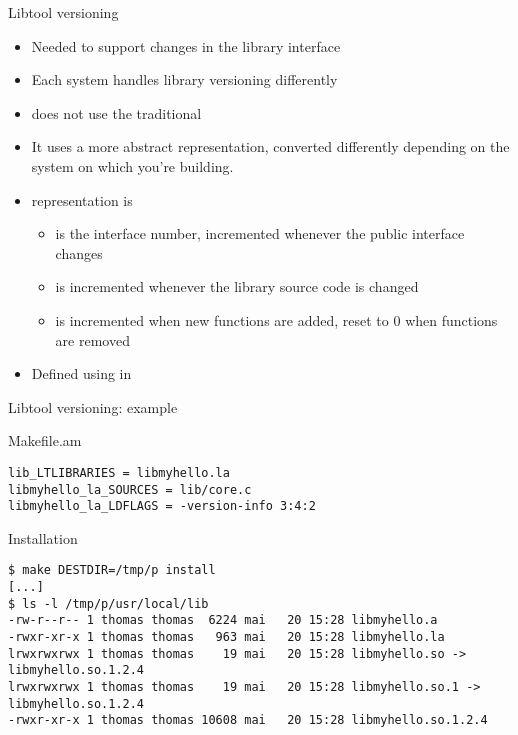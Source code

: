 \begin{frame}{Libtool versioning}
  \begin{itemize}
  \item Needed to support changes in the library interface
  \item Each system handles library versioning differently
  \item {} does not use the traditional
  \item It uses a more abstract representation, converted differently
    depending on the system on which you're building.
  \item {} representation is
    \begin{itemize}
    \item {} is the interface number, incremented whenever
      the public interface changes
    \item {} is incremented whenever the library source
      code is changed
    \item {} is incremented when new functions are added,
      reset to 0 when functions are removed
    \end{itemize}
  \item Defined using 
    in 
  \end{itemize}
\end{frame}

\begin{frame}[fragile]{Libtool versioning: example}

\begin{block}{Makefile.am}
\begin{verbatim}
lib_LTLIBRARIES = libmyhello.la
libmyhello_la_SOURCES = lib/core.c
libmyhello_la_LDFLAGS = -version-info 3:4:2
\end{verbatim}
\end{block}

\begin{block}{Installation}
\begin{verbatim}
$ make DESTDIR=/tmp/p install
[...]
$ ls -l /tmp/p/usr/local/lib
-rw-r--r-- 1 thomas thomas  6224 mai   20 15:28 libmyhello.a
-rwxr-xr-x 1 thomas thomas   963 mai   20 15:28 libmyhello.la
lrwxrwxrwx 1 thomas thomas    19 mai   20 15:28 libmyhello.so -> libmyhello.so.1.2.4
lrwxrwxrwx 1 thomas thomas    19 mai   20 15:28 libmyhello.so.1 -> libmyhello.so.1.2.4
-rwxr-xr-x 1 thomas thomas 10608 mai   20 15:28 libmyhello.so.1.2.4
\end{verbatim}
\end{block}

\end{frame}

